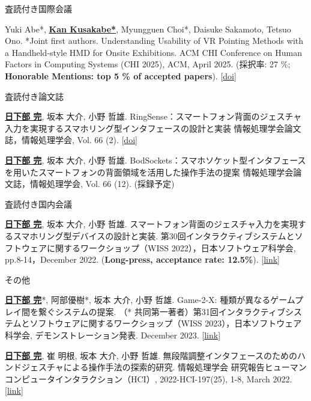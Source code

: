 \documentclass[
	11pt, %
]{resume} %
\begin{document}
\begin{rSection}{査読付き国際会議}{}{}{}
		\item Yuki Abe*, \underline{\textbf{Kan Kusakabe*}}, Myungguen Choi*, Daisuke Sakamoto, Tetsuo Ono. *Joint first authors. Understanding Usability of VR Pointing Methods with a Handheld-style HMD for Onsite Exhibitions. ACM CHI Conference on Human Factors in Computing Systems (CHI 2025), ACM, April 2025. (採択率: 27 \%; \textbf{Honorable Mentions: top 5 \% of accepted papers}). [\href{https://doi.org/10.1145/3706598.3713874}{doi}]
\end{rSection}

\begin{rSection}{査読付き論文誌}{}{}{}
	\item \underline{\textbf{日下部 完}}, 坂本 大介, 小野 哲雄. RingSense：スマートフォン背面のジェスチャ入力を実現するスマホリング型インタフェースの設計と実装 情報処理学会論文誌，情報処理学会, Vol. 66 (2). [\href{https://doi.org/10.20729/0002000028}{doi}]
	\item \underline{\textbf{日下部 完}}, 坂本 大介, 小野 哲雄. BodSockets：スマホソケット型インタフェースを用いたスマートフォンの背面領域を活用した操作手法の提案 情報処理学会論文誌，情報処理学会, Vol. 66 (12). (採録予定)
\end{rSection}

\begin{rSection}{査読付き国内会議}{}{}{}
		\item \underline{\textbf{日下部 完}}, 坂本 大介, 小野 哲雄. スマートフォン背面のジェスチャ入力を実現するスマホリング型デバイスの設計と実装. 第30回インタラクティブシステムとソフトウェアに関するワークショップ（WISS 2022），日本ソフトウェア科学会, pp.8-14，December 2022. (\textbf{Long-press, acceptance rate: 12.5\%}). [\href{https://www.wiss.org/WISS2022Proceedings/data/02.pdf}{link}]
\end{rSection}

\begin{rSection}{その他}{}{}{}
	\item \underline{\textbf{日下部 完}}*, 阿部優樹*, 坂本 大介, 小野 哲雄. Game-2-X: 種類が異なるゲームプレイ間を繋ぐシステムの提案. （* 共同第一著者）第31回インタラクティブシステムとソフトウェアに関するワークショップ（WISS 2023），日本ソフトウェア科学会, デモンストレーション発表. December 2023. [\href{https://www.wiss.org/WISS2023Proceedings/data/1-A03.pdf}{link}]
	\item \underline{\textbf{日下部 完}}, 崔 明根, 坂本 大介, 小野 哲雄. 無段階調整インタフェースのためのハンドジェスチャによる操作手法の探索的研究. 情報処理学会 研究報告ヒューマンコンピュータインタラクション（HCI）, 2022-HCI-197(25), 1-8, March 2022. [\href{http://id.nii.ac.jp/1001/00217337/}{link}]
\end{rSection}
\end{document}
